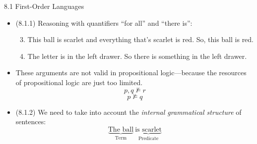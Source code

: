 \begin{frame}{8.1 First-Order Languages}

	\begin{itemize}%
	\itemsep=16pt
		
		\item (8.1.1) Reasoning with quantifiers ``for all'' and ``there is'':
		
		\begin{enumerate}[(1)]
		\setcounter{enumii}{2}
	
		\item This ball is scarlet and everything that's scarlet is red. So, this ball is red.
		
		\item The letter is in the left drawer. So there is something in the left drawer.
	
	\end{enumerate}
	
	\item These arguments are not valid in propositional logic---because the resources of propositional logic are just too limited.
	\[p,q\nvDash r\]
	\[p\nvDash q\]
		
	\item (8.1.2) We need to take into account the \emph{internal grammatical structure} of sentences:
		\[\underbrace{\text{The ball}}_{\text{Term}}~\underbrace{\text{is scarlet}}_{\text{Predicate}}\]
		
	\end{itemize}

\end{frame}


